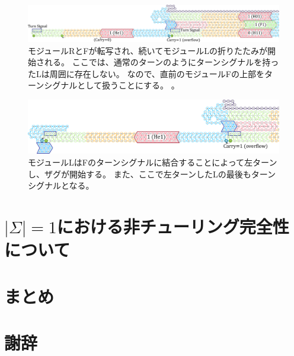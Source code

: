 \documentclass[a4j,11pt]{article}
\begin{document}
\begin{figure}[h]
\centering
\includegraphics[width=\linewidth]{fig/svg/CounterEx17_1.pdf}
\caption{
モジュールRとFが転写され、続いてモジュールLの折りたたみが開始される。
ここでは、通常のターンのようにターンシグナルを持ったLは周囲に存在しない。
なので、直前のモジュールFの上部をターンシグナルとして扱うことにする。
。
}
\label{fig:overflowex4}
\end{figure}

\begin{figure}[h]
\centering
\includegraphics[width=\linewidth]{fig/svg/CounterEx18_1.pdf}
\caption{
モジュールLはFのターンシグナルに結合することによって左ターンし、ザグが開始する。
また、ここで左ターンしたLの最後もターンシグナルとなる。
}
\label{fig:overflowex5}
\end{figure}
%
%
%

\section{$| \Sigma | = 1$における非チューリング完全性について}

\section{まとめ}

\section{謝辞}



\end{document}
